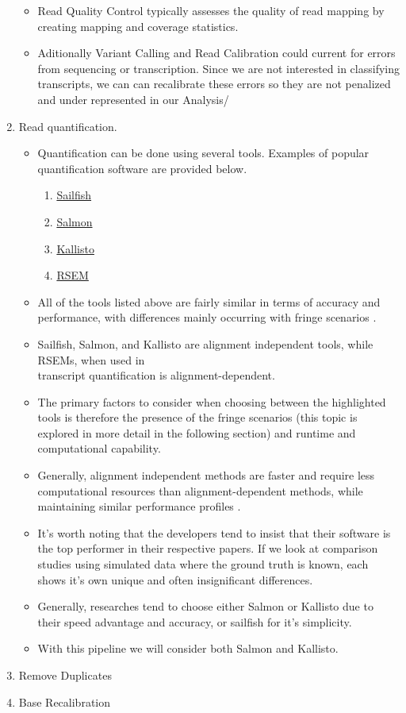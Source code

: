 \documentclass{article}
\begin{document}
\begin{enumerate}
\begin{itemize}
		\item Read Quality Control typically assesses the quality of read mapping by creating mapping and coverage statistics.
		\item Aditionally Variant Calling and Read Calibration could current for errors from sequencing or transcription. Since we are not interested in classifying transcripts, we can can recalibrate these errors so they are not penalized and under represented in our Analysis/
	\end{itemize}
	\item Read quantification.
	\begin{itemize}
		\item Quantification can be done using several tools. Examples of popular quantification software are provided below.
		\begin{enumerate}
			\item \href{https://www.cs.cmu.edu/~ckingsf/software/sailfish/faq.html}{Sailfish}\cite{Patro:2014aa}
			\item \href{https://combine-lab.github.io/salmon}{Salmon}\cite{Patro:2017aa}
			\item \href{https://pachterlab.github.io/kallisto/}{Kallisto}\cite{Bray:2016aa}
			\item \href{https://deweylab.github.io/RSEM/}{RSEM}\cite{Li:2011aa}
		\end{enumerate}
		\item All of the tools listed above are fairly similar in terms of accuracy and performance, with differences mainly occurring with fringe scenarios \cite{Zhang:2017aa}.
		\item Sailfish, Salmon, and Kallisto are alignment independent tools, while RSEMs, when used in\\ transcript quantification is alignment-dependent.
		\item The primary factors to consider when choosing between the highlighted tools is therefore the presence of the fringe scenarios (this topic is explored in more detail in the following section) and runtime and computational capability.
		\item Generally, alignment independent methods are faster and require less computational resources than alignment-dependent methods, while maintaining similar performance profiles \cite{Zhang:2017aa}.
		\item It's worth noting that the developers tend to insist that their software is the top performer in their respective papers. If we look at comparison studies using simulated data where the ground truth is known, each shows it's own unique and often insignificant differences.
		\item Generally, researches tend to choose either Salmon or Kallisto due to their speed advantage and accuracy, or sailfish for it's simplicity.
		\item With this pipeline we will consider both Salmon and Kallisto.	
	\end{itemize}
	\item{Remove Duplicates}
	\item {Base Recalibration}
\end{enumerate}
\end{document}
